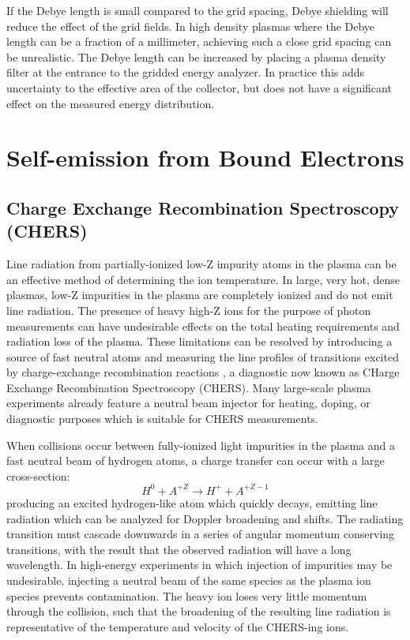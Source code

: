 \documentclass{jpp}
\begin{document}
If the Debye length is small compared to the grid spacing, Debye shielding will reduce the effect of the grid fields. In high density plasmas where the Debye length can be a fraction of a millimeter, achieving such a close grid spacing can be unrealistic. The Debye length can be increased by placing a plasma density filter at the entrance to the gridded energy analyzer. In practice this adds uncertainty to the effective area of the collector, but does not have a significant effect on the measured energy distribution.

\section{Self-emission from Bound Electrons}

\subsection{Charge Exchange Recombination Spectroscopy (CHERS)}

Line radiation from partially-ionized low-Z impurity atoms in the plasma can be an effective method of determining the ion temperature. In large, very hot, dense plasmas, low-Z impurities in the plasma are completely ionized and do not emit line radiation. The presence of heavy high-Z ions for the purpose of photon measurements can have undesirable effects on the total heating requirements and radiation loss of the plasma. These limitations can be resolved by introducing a source of fast neutral atoms and measuring the line profiles of transitions excited by charge-exchange recombination reactions \citep{doi:10.1063/1.93893}, a diagnostic now known as CHarge Exchange Recombination Spectroscopy (CHERS). Many large-scale plasma experiments already feature a neutral beam injector for heating, doping, or diagnostic purposes which is suitable for CHERS measurements.

When collisions occur between fully-ionized light impurities in the plasma and a fast neutral beam of hydrogen atoms, a charge transfer can occur with a large cross-section:
\begin{equation*}
H^0 + A^{+Z} \rightarrow H^+ + A^{+Z - 1}
\end{equation*}
producing an excited hydrogen-like atom which quickly decays, emitting line radiation which can be analyzed for Doppler broadening and shifts. The radiating transition must cascade downwards in a series of angular momentum conserving transitions, with the result that the observed radiation will have a long wavelength. In high-energy experiments in which injection of impurities may be undesirable, injecting a neutral beam of the same species as the plasma ion species prevents contamination. The heavy ion loses very little momentum through the collision, such that the broadening of the resulting line radiation is representative of the temperature and velocity of the CHERS-ing ions.
\end{document}
